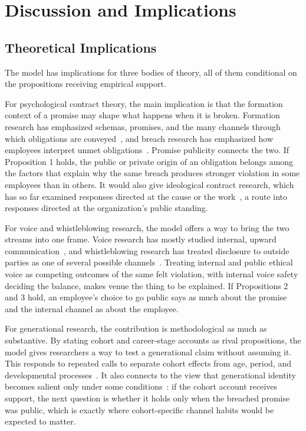 \section{Discussion and Implications}
\subsection{Theoretical Implications}

The model has implications for three bodies of theory, all of them conditional on the propositions receiving empirical support.

For psychological contract theory, the main implication is that the formation context of a promise may shape what happens when it is broken. Formation research has emphasized schemas, promises, and the many channels through which obligations are conveyed~\citep{rousseau2001schema}, and breach research has emphasized how employees interpret unmet obligations~\citep{morrison1997employees,robinson2000development}. Promise publicity connects the two. If Proposition 1 holds, the public or private origin of an obligation belongs among the factors that explain why the same breach produces stronger violation in some employees than in others. It would also give ideological contract research, which has so far examined responses directed at the cause or the work~\citep{yang2022going,deng2023serving}, a route into responses directed at the organization's public standing.

For voice and whistleblowing research, the model offers a way to bring the two streams into one frame. Voice research has mostly studied internal, upward communication~\citep{morrison2014employee,morrison2023employee}, and whistleblowing research has treated disclosure to outside parties as one of several possible channels~\citep{miceli2008whistleblowing,culiberg2017evolution}. Treating internal and public ethical voice as competing outcomes of the same felt violation, with internal voice safety deciding the balance, makes venue the thing to be explained. If Propositions 2 and 3 hold, an employee's choice to go public says as much about the promise and the internal channel as about the employee.

For generational research, the contribution is methodological as much as substantive. By stating cohort and career-stage accounts as rival propositions, the model gives researchers a way to test a generational claim without assuming it. This responds to repeated calls to separate cohort effects from age, period, and developmental processes~\citep{parry2011generational,rudolph2017considering,rudolph2021generations}. It also connects to the view that generational identity becomes salient only under some conditions~\citep{joshi2010unpacking}: if the cohort account receives support, the next question is whether it holds only when the breached promise was public, which is exactly where cohort-specific channel habits would be expected to matter.

